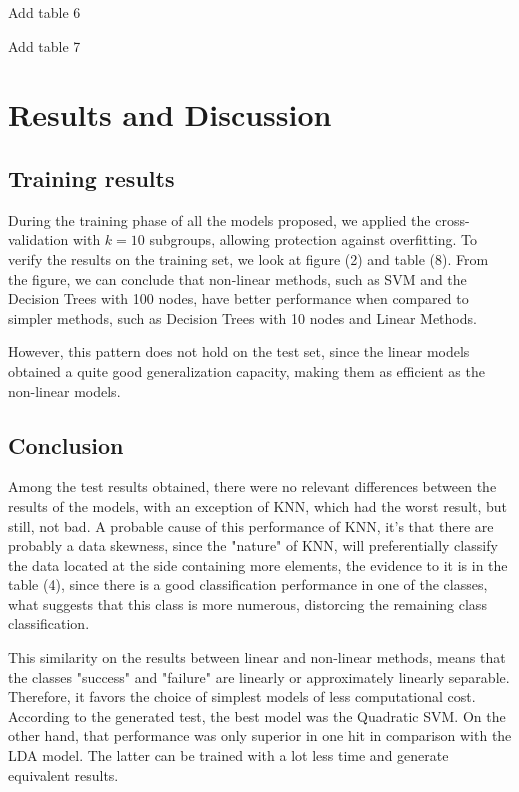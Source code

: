 \documentclass[conference]{IEEEtran}
\newcommand{\reviewUrgent}[1]{{\color{red} #1}} %
\begin{document}
\reviewUrgent{Add table 6}

\reviewUrgent{Add table 7}

\section{Results and Discussion}

\subsection{Training results}

During the training phase of all the models proposed, we applied the cross-validation 
with $k=10$ subgroups, allowing protection against overfitting. To verify the results
on the training set, we look at figure (2) and table (8). From the figure, we can 
conclude that non-linear methods, such as SVM and the Decision Trees with 100 nodes, 
have better performance when compared to simpler methods, such as Decision Trees with 10 
nodes and Linear Methods.

However, this pattern does not hold on the test set, since the linear models obtained 
a quite good generalization capacity, making them as efficient as the non-linear models.

\subsection{Conclusion}

Among the test results obtained, there were no relevant differences between the results 
of the models, with an exception of KNN, which had the worst result, but still, not bad. 
A probable cause of this performance of KNN, it's that there are probably a data skewness, 
since the "nature" of KNN, will preferentially classify the data located at the side 
containing more elements, the evidence to it is in the table (4), since there is a 
good classification performance in one of the classes, what suggests that this class 
is more numerous, distorcing the remaining class classification.

This similarity on the results between linear and non-linear methods, means that 
the classes "success" and "failure" are linearly or approximately linearly separable. 
Therefore, it favors the choice of simplest models of less computational cost. 
According to the generated test, the best model was the Quadratic SVM. On the other hand,
that performance was only superior in one hit in comparison with the LDA model. The latter
can be trained with a lot less time and generate equivalent results. 
\end{document}
